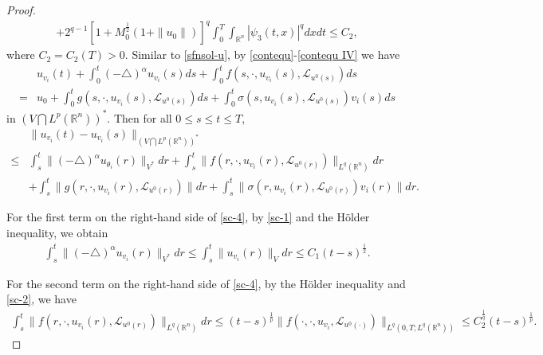 \documentclass[11pt]{article}
\numberwithin{equation}{section}
\theoremstyle{plain}
\def\leq{\leqslant}
\begin{document}
\begin{proof}
\begin{align}
        + 2^{q-1}
        \left[ 1 + M_0^{\frac 12}(1 + \|u_0\|)
        \right]^q
        \int_0^T \int_{\mathbb{R}^n} |\psi_3(t,x)|^q dx dt
        \le  C_2,
    \end{align}
    where $C_2=C_2(T)>0$.
    Similar to \eqref{sfnsol-u},
    by \eqref{contequ}-\eqref{contequ IV}
    we have
    \begin{align} \label{sc-3}
        & u_{v_i} (t)
        + \int_0^t (-\triangle)^{\alpha} u_{v_i}(s) ds
        + \int_0^t f( s, \cdot, u_{v_i}(s), \mathcal{L}_{u^0(s)} ) ds
        \nonumber \\
        = & u_0
        + \int_0^t g(s, \cdot, u_{v_i}(s), \mathcal{L}_{u^0(s)} ) ds
        + \int_0^t \sigma(s, u_{v_i}(s), \mathcal{L}_{u^0(s)} ) v_i(s) ds
    \end{align}
    in $  \left( V \bigcap L^p(\mathbb{R}^n) \right)^\ast$.
    Then for all $0 \leq s \leq t \leq T$,
    \begin{align} \label{sc-4}
        & \| u_{v_i} (t) - u_{v_i} (s) \|_{\left( V \bigcap L^p(\mathbb{R}^n) \right)^\ast}
        \nonumber \\
        \leq & \int_s^t \| (-\triangle)^{\alpha} u_{\theta_i}(r) \|_{V^\ast} dr
        + \int_s^t \| f( r, \cdot, u_{v_i}(r), \mathcal{L}_{u^0(r)} ) \|_{L^q(\mathbb{R}^n)} dr
        \nonumber \\
        & + \int_s^t \| g(r, \cdot, u_{v_i}(r), \mathcal{L}_{u^0(r)} ) \| dr
        + \int_s^t \| \sigma(r, u_{v_i}(r), \mathcal{L}_{u^0(r)} ) v_i(r) \| dr.
    \end{align}


    For the first term on the right-hand side of \eqref{sc-4},
    by
    \eqref{sc-1}
    and the H\"{o}lder inequality,
    we obtain
    \begin{align} \label{sc-5}
        \int_s^t \| (-\triangle)^{\alpha} u_{v_i}(r) \|_{V^\ast} dr
        \leq \int_s^t \| u_{v_i}(r) \|_{V} dr
        \leq C_1 (t-s)^{\frac{1}{2}}.
    \end{align}

    For the second term on the right-hand side of \eqref{sc-4},
    by the H\"{o}lder inequality and \eqref{sc-2}, we have
    \begin{align} \label{sc-6}
        \int_s^t \| f( r, \cdot, u_{v_i}(r), \mathcal{L}_{u^0(r)} ) \|_{L^q(\mathbb{R}^n)} dr
        \leq (t-s)^{\frac{1}{p}} \| f( \cdot, \cdot, u_{v_i}, \mathcal{L}_{u^0(\cdot)} ) \|_{ L^q( 0, T; L^q(\mathbb{R}^n) ) }
        \leq C_2^{\frac{1}{q}} (t-s)^{\frac{1}{p}}.
    \end{align}


\end{proof}
\end{document}
